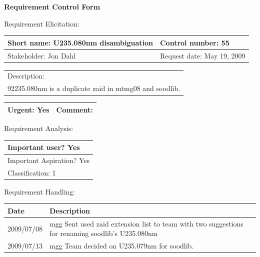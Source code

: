\begin{center}\Large\bf
Requirement Control Form
\end{center}
\vspace{24pt}

Requirement Elicitation:

\begin{tabular}{|p{211pt}|p{211pt}|} \hline
Short name: U235.080nm disambiguation & Control number: 55\\ \hline
Stakeholder: Jon Dahl & Request date: May 19, 2009\\
\end{tabular}
\begin{tabular}{|p{433pt}|} \hline
Description: \\ 
92235.080nm is a duplicate zaid in mtmg08 and soodlib.\\
\hline
\end{tabular} 
\begin{tabular}{|p{211pt}|p{211pt}|} \hline
Urgent: Yes & Comment: \\ \hline
\end{tabular}

\vspace{24pt}

Requirement Analysis:

\begin{tabular}{|p{433pt}|} \hline
Important user? Yes \\ \hline
Important Aspiration? Yes \\ \hline
Classification: 1 \\ \hline
\end{tabular}
\vspace{24pt}

Requirement Handling:

\begin{tabular}{|p{72pt}|p{351pt}|} \hline
Date & Description \\ \hline
2009/07/08 & mgg Sent used zaid extension list to team with two
suggestions for renaming soodlib's U235.080nm \\ \hline
2009/07/13 & mgg Team decided on U235.079nm for soodlib.\\ \hline
\end{tabular}
